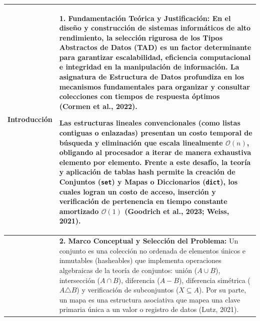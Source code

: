 \documentclass[11pt,a4paper]{article}
\begin{document}
\vspace{-1.2pt}


\noindent
\begin{longtable}{
    |>{\bfseries\centering\arraybackslash}p{3.2cm}|
    >{\setlength{\parindent}{0cm}\setstretch{1.12}}p{13.2cm}|
}

\hline
\endfirsthead

\hline
\endhead

\hline
\endfoot

\hline
\endlastfoot


Introducción
&
\textbf{1. Fundamentación Teórica y Justificación:}\newline
En el diseño y construcción de sistemas informáticos de alto rendimiento, la selección rigurosa de los Tipos Abstractos de Datos (TAD) es un factor determinante para garantizar escalabilidad, eficiencia computacional e integridad en la manipulación de información. La asignatura de Estructura de Datos profundiza en los mecanismos fundamentales para organizar y consultar colecciones con tiempos de respuesta óptimos (Cormen et al., 2022).

Las estructuras lineales convencionales (como listas contiguas o enlazadas) presentan un costo temporal de búsqueda y eliminación que escala linealmente $\mathcal{O}(n)$, obligando al procesador a iterar de manera exhaustiva elemento por elemento. Frente a este desafío, la teoría y aplicación de tablas hash permite la creación de \textbf{Conjuntos (\texttt{set})} y \textbf{Mapas o Diccionarios (\texttt{dict})}, los cuales logran un costo de acceso, inserción y verificación de pertenencia en tiempo constante amortizado $\mathcal{O}(1)$ (Goodrich et al., 2023; Weiss, 2021).
\\

\hline

&
\textbf{2. Marco Conceptual y Selección del Problema:}\newline
Un conjunto es una colección no ordenada de elementos únicos e inmutables (hasheables) que implementa operaciones algebraicas de la teoría de conjuntos: unión ($A \cup B$), intersección ($A \cap B$), diferencia ($A - B$), diferencia simétrica ($A \triangle B$) y verificación de subconjuntos ($X \subseteq A$). Por su parte, un mapa es una estructura asociativa que mapea una clave primaria única a un valor o registro de datos (Lutz, 2021).


\end{longtable}
\end{document}
